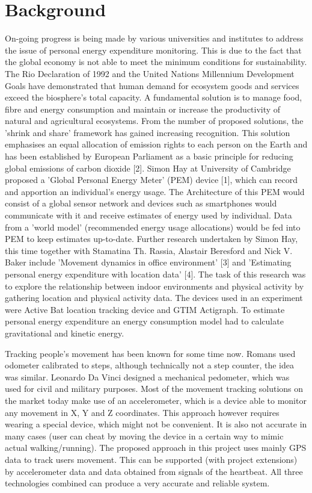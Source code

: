 \documentclass[12pt, a4paper]{report}   %
\begin{document}
\chapter{Background}
On-going progress is being made by various universities and institutes to address the issue of personal energy expenditure monitoring. This is due to the fact that the global economy is not able to meet the minimum conditions for sustainability. The Rio Declaration of 1992 and the United Nations Millennium Development Goals have demonstrated that human demand for ecosystem goods and services exceed the biosphere's total capacity. A fundamental solution is to manage food, fibre and energy consumption and maintain or increase the productivity of natural and agricultural ecosystems. From the number of proposed solutions, the 'shrink and share' framework has gained increasing recognition. This solution emphasises an equal allocation of emission rights to each person on the Earth and has been established by European Parliament as a basic principle for reducing global emissions of carbon dioxide [2].  Simon Hay at University of Cambridge proposed a 'Global Personal Energy Meter' (PEM) device [1], which can record and apportion an individual's energy usage. The Architecture of this PEM would consist of a global sensor network and devices such as smartphones would communicate with it and receive estimates of energy used by individual. Data from a 'world model' (recommended energy usage allocations) would be fed into PEM to keep estimates up-to-date.  Further research undertaken by Simon Hay, this time together with Stamatina Th. Rassia, Alastair Beresford and Nick V. Baker include 'Movement dynamics in office environment' [3] and 'Estimating personal energy expenditure with location data' [4]. The task of this research was to explore the relationship between indoor environments and physical activity by gathering location and physical activity data. The devices used in an experiment were Active Bat location tracking device and GTIM Actigraph. To estimate personal energy expenditure an energy consumption model had to calculate gravitational and kinetic energy.

Tracking people's movement has been known for some time now. Romans used odometer calibrated to steps, although technically not a step counter, the idea was similar. Leonardo Da Vinci designed a mechanical pedometer, which was used for civil and military purposes. Most of the movement tracking solutions on the market today make use of an accelerometer, which is a device able to monitor any movement in X, Y and Z coordinates. This approach however requires wearing a special device, which might not be convenient. It is also not accurate in many cases (user can cheat by moving the device in a certain way to mimic actual walking/running).
The proposed approach in this project uses mainly GPS data to track users movement. This can be supported (with project extensions) by accelerometer data and data obtained from signals of the heartbeat. All three technologies combined can produce a very accurate and reliable system.
\end{document}
